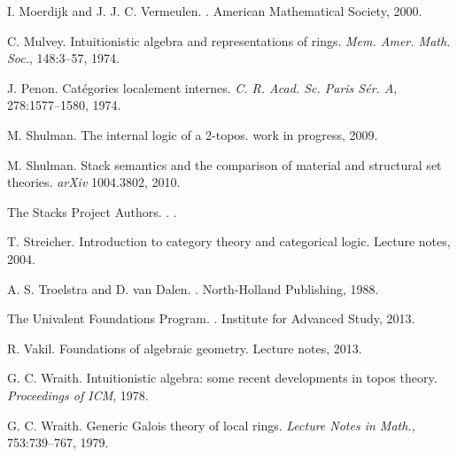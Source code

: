 \documentclass[10pt,utf8,notheorems,compress]{beamer}
\newcommand{\?}{\,{:}\,}
\renewcommand{\_}{\mathpunct{.}\,}
\newcommand{\backupend}{
  \addtocounter{framenumbervorappendix}{-\value{framenumber}}
  \addtocounter{framenumber}{\value{framenumbervorappendix}} 
}
\begin{document}
{\begin{thebibliography}{1800}
      I. Moerdijk and J. J. C. Vermeulen.
      .
      \newblock American Mathematical Society, 2000.

      C. Mulvey.
      \newblock Intuitionistic algebra and representations of rings.
      \newblock \emph{Mem. Amer. Math. Soc.}, 148:3--57, 1974.

      J. Penon.
      \newblock Catégories localement internes.
      \newblock \emph{C. R. Acad. Sc. Paris Sér. A}, 278:1577--1580, 1974.

      M. Shulman.
      \newblock The internal logic of a 2-topos.
      \newblock work in progress, 2009.

      M. Shulman.
      \newblock Stack semantics and the comparison of material and structural set theories.
      \newblock \emph{arXiv} 1004.3802, 2010.

      The Stacks Project Authors.
      .
      .

      T. Streicher.
      \newblock Introduction to category theory and categorical logic.
      \newblock Lecture notes, 2004.

      A. S. Troelstra and D. van Dalen.
      .
      \newblock North-Holland Publishing, 1988.

      The Univalent Foundations Program.
      .
      \newblock Institute for Advanced Study, 2013.

      R. Vakil.
      \newblock Foundations of algebraic geometry.
      \newblock Lecture notes, 2013.

      G. C. Wraith.
      \newblock Intuitionistic algebra: some recent developments in topos theory.
      \newblock \emph{Proceedings of ICM}, 1978.

      G. C. Wraith.
      \newblock Generic Galois theory of local rings.
      \newblock \emph{Lecture Notes in Math.}, 753:739--767, 1979.
  \end{thebibliography}
}
\backupend

\end{document}
